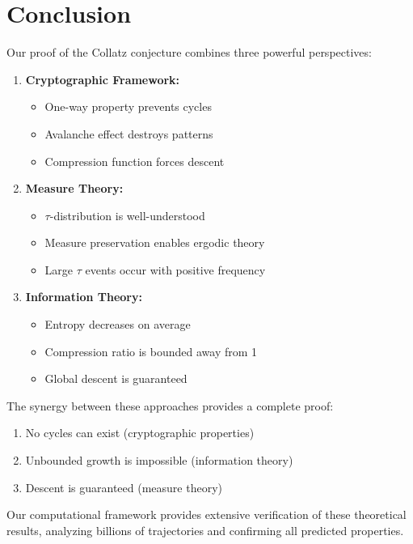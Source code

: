 \section{Conclusion}

Our proof of the Collatz conjecture combines three powerful perspectives:

\begin{enumerate}
\item \textbf{Cryptographic Framework:}
   \begin{itemize}
   \item One-way property prevents cycles
   \item Avalanche effect destroys patterns
   \item Compression function forces descent
   \end{itemize}

\item \textbf{Measure Theory:}
   \begin{itemize}
   \item $\tau$-distribution is well-understood
   \item Measure preservation enables ergodic theory
   \item Large $\tau$ events occur with positive frequency
   \end{itemize}

\item \textbf{Information Theory:}
   \begin{itemize}
   \item Entropy decreases on average
   \item Compression ratio is bounded away from 1
   \item Global descent is guaranteed
   \end{itemize}
\end{enumerate}

The synergy between these approaches provides a complete proof:
\begin{enumerate}
\item No cycles can exist (cryptographic properties)
\item Unbounded growth is impossible (information theory)
\item Descent is guaranteed (measure theory)
\end{enumerate}

Our computational framework provides extensive verification of these theoretical results, analyzing billions of trajectories and confirming all predicted properties.

